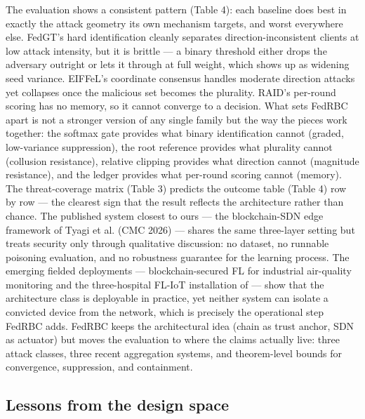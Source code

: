 \documentclass[cmc,article,submit,moreauthors,pdftex]{Definitions/tsp}
\begin{document}
The evaluation shows a consistent pattern (Table 4): each baseline does best in exactly the attack geometry its own mechanism targets, and worst everywhere else. FedGT's hard identification cleanly separates direction-inconsistent clients at low attack intensity, but it is brittle --- a binary threshold either drops the adversary outright or lets it through at full weight, which shows up as widening seed variance. EIFFeL's coordinate consensus handles moderate direction attacks yet collapses once the malicious set becomes the plurality. RAID's per-round scoring has no memory, so it cannot converge to a decision. What sets FedRBC apart is not a stronger version of any single family but the way the pieces work together: the softmax gate provides what binary identification cannot (graded, low-variance suppression), the root reference provides what plurality cannot (collusion resistance), relative clipping provides what direction cannot (magnitude resistance), and the ledger provides what per-round scoring cannot (memory). The threat-coverage matrix (Table 3) predicts the outcome table (Table 4) row by row --- the clearest sign that the result reflects the architecture rather than chance. The published system closest to ours --- the blockchain-SDN edge framework of Tyagi et al. (CMC 2026) \cite{ref-53} --- shares the same three-layer setting but treats security only through qualitative discussion: no dataset, no runnable poisoning evaluation, and no robustness guarantee for the learning process. The emerging fielded deployments --- blockchain-secured FL for industrial air-quality monitoring \cite{ref-33} and the three-hospital FL-IoT installation of \cite{ref-34} --- show that the architecture class is deployable in practice, yet neither system can isolate a convicted device from the network, which is precisely the operational step FedRBC adds. FedRBC keeps the architectural idea (chain as trust anchor, SDN as actuator) but moves the evaluation to where the claims actually live: three attack classes, three recent aggregation systems, and theorem-level bounds for convergence, suppression, and containment.

\subsection{Lessons from the design space}\label{sec:lessons-from-the-design-space}
\end{document}
